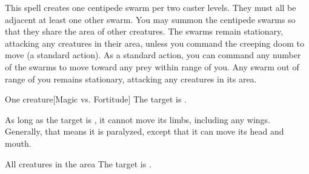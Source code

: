 \begin{spellheader}
    \spellrng{\rngmed}
    \spelldur{\durmed}
\end{spellheader}
\begin{spelleffects}
    \spelleffect This spell creates one centipede swarm per two caster levels. They must all be adjacent at least one other swarm. You may summon the centipede swarms so that they share the area of other creatures. The swarms remain stationary, attacking any creatures in their area, unless you command the creeping doom to move (a standard action). As a standard action, you can command any number of the swarms to move toward any prey within range of you. Any swarm out of range of you remains stationary, attacking any creatures in its area.
\end{spelleffects}
\begin{spellfooter}
    
\end{spellfooter}

\begin{spellheader}
    \spellrng{\rngmed}
    \spelldur{\durshort}
\end{spellheader}
\begin{spelleffects}
    \begin{spelltarget}{One creature}[Magic vs. Fortitude]
        \spellsuccess The target is \staggered.

        As long as the target is \bloodied, it cannot move its limbs, including any wings. Generally, that means it is paralyzed, except that it can move its head and mouth.
    \end{spelltarget}
\end{spelleffects}
\begin{spellfooter}
    
\end{spellfooter}

\begin{spellheader}
    \spelldur{\durmed}
\end{spellheader}
\begin{spelleffects}
    \begin{spelltargets}{All creatures in the area}
        The target is \vulnerable.
    \end{spelltargets}
\end{spelleffects}
\begin{spellfooter}
    
\end{spellfooter}


